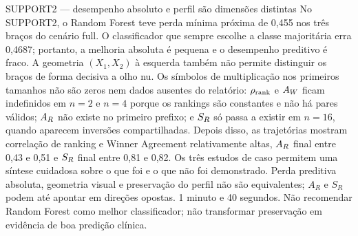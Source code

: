{\begin{frame}{SUPPORT2 — desempenho absoluto e perfil são dimensões distintas}
  \speakernotes
    {No SUPPORT2, o Random Forest teve perda mínima próxima de 0,455 nos três braços do cenário full. O classificador que sempre escolhe a classe majoritária erra 0,4687; portanto, a melhoria absoluta é pequena e o desempenho preditivo é fraco. A geometria $(X_1,X_2)$ à esquerda também não permite distinguir os braços de forma decisiva a olho nu. Os símbolos de multiplicação nos primeiros tamanhos não são zeros nem dados ausentes do relatório: $\rho_{\mathrm{rank}}$ e $A_W$ ficam indefinidos em $n=2$ e $n=4$ porque os rankings são constantes e não há pares válidos; $A_R$ não existe no primeiro prefixo; e $S_R$ só passa a existir em $n=16$, quando aparecem inversões compartilhadas. Depois disso, as trajetórias mostram correlação de ranking e Winner Agreement relativamente altas, $A_R$ final entre 0,43 e 0,51 e $S_R$ final entre 0,81 e 0,82.}
    {Os três estudos de caso permitem uma síntese cuidadosa sobre o que foi e o que não foi demonstrado.}
    {Perda preditiva absoluta, geometria visual e preservação do perfil não são equivalentes; $A_R$ e $S_R$ podem até apontar em direções opostas.}
    {1 minuto e 40 segundos.}
    {Não recomendar Random Forest como melhor classificador; não transformar preservação em evidência de boa predição clínica.}
\end{frame}}

